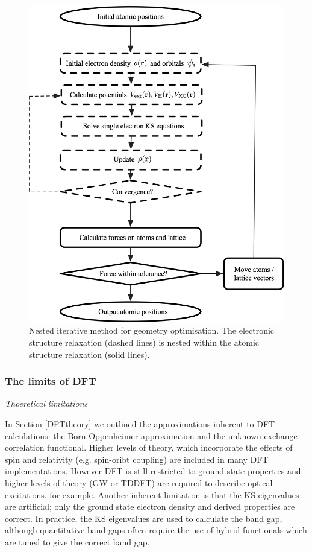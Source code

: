 \begin{figure}[h]
\centering
  \includegraphics[resolution=450]{figures/ch3/scf.png}
  \caption[Nested iterative method for geometry optimisation]{Nested iterative method for geometry optimisation. The electronic structure relaxation (dashed lines) is nested within the atomic structure relaxation (solid lines).} 
  \label{SCF}
\end{figure}
\subsubsection{The limits of DFT}

\textit{Thoeretical limitations}

In Section \ref{DFTtheory} we outlined the approximations inherent to DFT calculations: the Born-Oppenheimer approximation and the unknown exchange-correlation functional. Higher levels of theory, which incorporate the effects of spin and relativity (e.g. spin-oribt coupling) are included in many DFT implementations. However DFT is still restricted to ground-state properties and higher levels of theory (GW or TDDFT) are required to describe optical excitations, for example. Another inherent limitation is that the KS eigenvalues are artificial; only the ground state electron density and derived properties are correct. In practice, the KS eigenvalues are used to calculate the band gap, although quantitative band gaps often require the use of hybrid functionals which are tuned to give the correct band gap.

